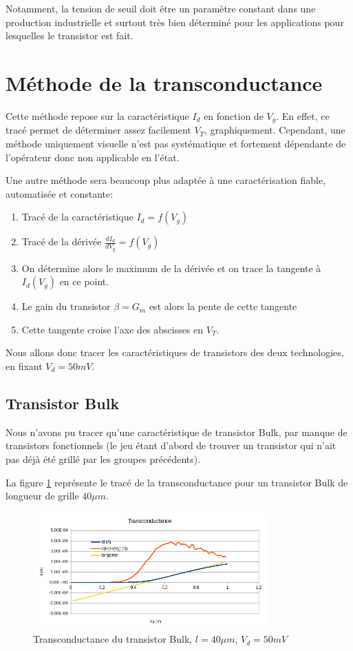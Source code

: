 \documentclass[a4paper,11pt]{report}
\begin{document}
Notamment, la tension de seuil doit être un paramètre constant dans une production industrielle et surtout très bien déterminé pour les applications pour lesquelles le transistor est fait.

\section{Méthode de la transconductance}
Cette méthode repose sur la caractéristique $I_d$ en fonction de $V_g$. En effet, ce tracé permet de déterminer assez facilement $V_T$, graphiquement. Cependant, une méthode uniquement visuelle n'est pas systématique et fortement dépendante de l'opérateur donc non applicable en l'état.

Une autre méthode sera beaucoup plus adaptée à une caractérisation fiable, automatisée et constante:
\begin{enumerate}
    \item Tracé de la caractéristique $I_d = f(V_g)$
    \item Tracé de la dérivée $\frac{d I_d}{d V_g} = f(V_g)$
    \item On détermine alors le maximum de la dérivée et on trace la tangente à $I_d(V_g)$ en ce point.
    \item Le gain du transistor $\beta = G_m$ est alors la pente de cette tangente
    \item Cette tangente croise l'axe des abscisses en $V_T$.
\end{enumerate}

Nous allons donc tracer les caractéristiques de transistors des deux technologies, en fixant $V_d = 50mV$.

\subsection{Transistor Bulk}
Nous n'avons pu tracer qu'une caractéristique de transistor Bulk, par manque de transistors fonctionnels (le jeu étant d'abord de trouver un transistor qui n'ait pas déjà été grillé par les groupes précédents).

La figure \ref{transconductance bulk} représente le tracé de la transconductance pour un transistor Bulk de longueur de grille $40\mu m$.

\begin{figure}[h]
    \begin{center}
        \includegraphics[width=0.8\textwidth]{Images/Bulk40-Transconductance}
        \caption{Transconductance du transistor Bulk, $l=40\mu m$, $V_d = 50mV$}
        \label{transconductance bulk}
    \end{center}
\end{figure}
\end{document}

